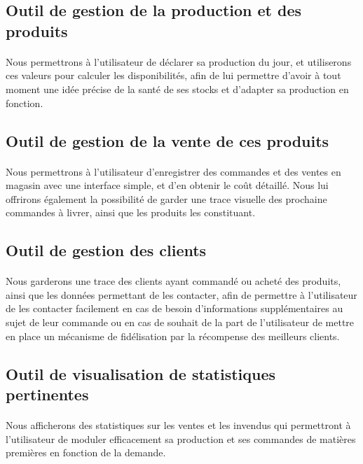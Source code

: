     \subsection{Outil de gestion de la production et des produits}
        \paragraph{}
            Nous permettrons à l'utilisateur de déclarer sa production du jour,
            et utiliserons ces valeurs pour calculer les disponibilités, afin de
            lui permettre d'avoir à tout moment une idée précise de la santé de
            ses stocks et d'adapter sa production en fonction.
    \subsection{Outil de gestion de la vente de ces produits}
        \paragraph{}
            Nous permettrons à l'utilisateur d'enregistrer des commandes et des
            ventes en magasin avec une interface simple, et d'en obtenir le
            coût détaillé.
            Nous lui offrirons également la possibilité de garder une trace
            visuelle des prochaine commandes à livrer, ainsi que les produits
            les constituant.
    \subsection{Outil de gestion des clients}
        \paragraph{}
            Nous garderons une trace des clients ayant commandé ou acheté des
            produits, ainsi que les données permettant de les contacter,
            afin de permettre à l'utilisateur de les contacter facilement en
            cas de besoin d'informations supplémentaires au sujet de leur
            commande ou en cas de souhait de la part de l'utilisateur de mettre
            en place un mécanisme de fidélisation par la récompense des
            meilleurs clients.
    \subsection{Outil de visualisation de statistiques pertinentes}
        \paragraph{}
            Nous afficherons des statistiques sur les ventes et les invendus qui
            permettront à l'utilisateur de moduler efficacement sa production et
            ses commandes de matières premières en fonction de la demande.